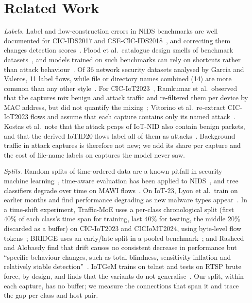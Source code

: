 \section{Related Work}\label{sec:related}

\emph{Labels.} Label and flow-construction errors in NIDS benchmarks are well documented for CIC-IDS2017 and CSE-CIC-IDS2018~\cite{engelen2021troubleshooting,liu2022error}, and correcting them changes detection scores~\cite{lanvin2023errors}. Flood et al.\ catalogue design smells of benchmark datasets~\cite{flood2024smells}, and models trained on such benchmarks can rely on shortcuts rather than attack behaviour~\cite{jacobs2022emperor}. Of 36 network security datasets analysed by Garcia and Valeros, 11 label flows, while file or directory names combined (14) are more common than any other style~\cite{garcia2023labeling}. For CIC-IoT2023~\cite{neto2023ciciot2023}, Ramkumar et al.\ observed that the captures mix benign and attack traffic and re-filtered them per device by MAC address, but did not quantify the mixing~\cite{ramkumar2024diagnosing}; Vitorino et al.\ re-extract CIC-IoT2023 flows and assume that each capture contains only its named attack~\cite{vitorino2025revisiting}. Kostas et al.\ note that the attack pcaps of IoT-NID also contain benign packets, and that the derived IoTID20 flows label all of them as attacks~\cite[App.~A.3]{kostas2024iotgem}. Background traffic in attack captures is therefore not new; we add its share per capture and the cost of file-name labels on captures the model never saw.

\emph{Splits.} Random splits of time-ordered data are a known pitfall in security machine learning~\cite{arp2022dos,pendlebury2019tesseract,apruzzese2023sok}, time-aware evaluation has been applied to NIDS~\cite{andresini2021insomnia}, and tree classifiers degrade over time on MAWI flows~\cite{schraven2026mawiflow}. On IoT-23, Lyon et al.\ train on earlier months and find performance degrading as new malware types appear~\cite{lyon2026iot23drift}. In a time-shift experiment, Traffic-MoE uses a per-class chronological split (first 40\% of each class's time span for training, last 40\% for testing, the middle 20\% discarded as a buffer) on CIC-IoT2023 and CICIoMT2024, using byte-level flow tokens~\cite{zhou2026trafficmoe}; BRIDGE uses an early/late split in a pooled benchmark~\cite{bridge2026tchnet}; and Rasheed and Alobaedy find that drift causes no consistent decrease in performance but ``specific behaviour changes, such as total blindness, sensitivity inflation and relatively stable detection''~\cite{rasheed2026drift}. IoTGeM trains on telnet and tests on RTSP brute force, by design, and finds that the variants do not generalise~\cite{kostas2024iotgem}. Our split, within each capture, has no buffer; we measure the connections that span it and trace the gap per class and host pair.


